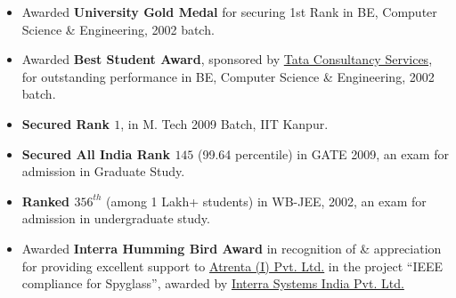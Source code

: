 \documentclass[9pt]{article}
\newenvironment{changemargin}[2]{%
  \begin{list}{}{%
    \setlength{\topsep}{0pt}%
    \setlength{\leftmargin}{#1}%
    \setlength{\rightmargin}{#2}%
    \setlength{\listparindent}{\parindent}%
    \setlength{\itemindent}{\parindent}%
    \setlength{\parsep}{\parskip}%
  }%
  \item[]}{\end{list}
}
\newenvironment{body} {
	\vspace*{-16pt}
	\begin{changemargin}{-0.25in}{-0.5in}
  }	
	{\end{changemargin}
}
\begin{document}
\begin{body}
	\vspace{14pt}
	\begin{itemize} \itemsep -0pt  %
		\item Awarded \textbf{University Gold Medal} for securing 1st Rank in BE, Computer Science \& Engineering, 2002 batch.\\
		\item Awarded \textbf{Best Student Award}, sponsored by \href{http://www.tcs.com}{Tata Consultancy Services}, for outstanding performance in BE, Computer Science \& Engineering, 2002 batch. \\
		\item \textbf{Secured Rank $1$}, in M. Tech 2009 Batch, IIT Kanpur.
		\item \textbf{Secured All India Rank $145$} (99.64 percentile) in GATE 2009, an exam for admission in Graduate Study.
		\item \textbf{Ranked $356^{th}$} (among 1 Lakh+ students) in WB-JEE, 2002, an exam for admission in undergraduate study.
		\item Awarded \textbf{Interra Humming Bird Award} in recognition of \& appreciation for providing excellent support to \href{}{Atrenta (I) Pvt. Ltd.} in the project ``IEEE compliance for Spyglass'', awarded by \href{http://www.interrasystems.com/}{Interra Systems India Pvt. Ltd.} 
	\end{itemize} 
\end{body}

\smallskip
\end{document}
